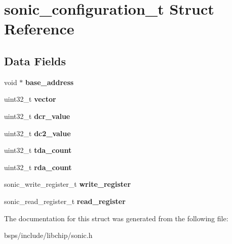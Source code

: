 \hypertarget{structsonic__configuration__t}{}\section{sonic\+\_\+configuration\+\_\+t Struct Reference}
\label{structsonic__configuration__t}
\subsection*{Data Fields}
\begin{DoxyCompactItemize}
\item 
\mbox{\label{structsonic__configuration__t_ac77b6650d373f19aa0c5d8aa2e9e8187}} 
void $\ast$ {\bfseries base\+\_\+address}
\item 
\mbox{\label{structsonic__configuration__t_a1731800f486a8b3f0069e0daf2c37985}} 
uint32\+\_\+t {\bfseries vector}
\item 
\mbox{\label{structsonic__configuration__t_aa69c95697885640e47cc0c69dd89ee19}} 
uint32\+\_\+t {\bfseries dcr\+\_\+value}
\item 
\mbox{\label{structsonic__configuration__t_a1ab088992d7b3fa18ef385639cea912c}} 
uint32\+\_\+t {\bfseries dc2\+\_\+value}
\item 
\mbox{\label{structsonic__configuration__t_a9b3a7926b4cbcd5a31142f158393df63}} 
uint32\+\_\+t {\bfseries tda\+\_\+count}
\item 
\mbox{\label{structsonic__configuration__t_ac640bf99230f3569a19101f64e7c3483}} 
uint32\+\_\+t {\bfseries rda\+\_\+count}
\item 
\mbox{\label{structsonic__configuration__t_ab1fca3aa5f82753b0704e14bbf4f6434}} 
sonic\+\_\+write\+\_\+register\+\_\+t {\bfseries write\+\_\+register}
\item 
\mbox{\label{structsonic__configuration__t_a7320fcce640132096f56189bda57baf4}} 
sonic\+\_\+read\+\_\+register\+\_\+t {\bfseries read\+\_\+register}
\end{DoxyCompactItemize}


The documentation for this struct was generated from the following file\+:\begin{DoxyCompactItemize}
\item 
bsps/include/libchip/sonic.\+h\end{DoxyCompactItemize}
